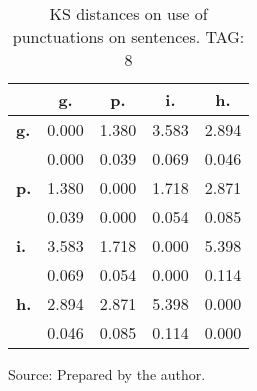 \begin{table}[h!]
\begin{center}
\caption{KS distances on use of punctuations on sentences. TAG: 8}
	\label{tab:kolPct}
\begin{tabular}{| l || c | c | c | c |}\hline
 & {\bf g.} & {\bf p.} & {\bf i.} & {\bf h.} \\\hline\hline
{\bf g.} & 0.000 & 1.380 & 3.583 & 2.894 \\
{\bf } & 0.000 & 0.039 & 0.069 & 0.046 \\\hline
{\bf p.} & 1.380 & 0.000 & 1.718 & 2.871 \\
{\bf } & 0.039 & 0.000 & 0.054 & 0.085 \\\hline
{\bf i.} & 3.583 & 1.718 & 0.000 & 5.398 \\
{\bf } & 0.069 & 0.054 & 0.000 & 0.114 \\\hline
{\bf h.} & 2.894 & 2.871 & 5.398 & 0.000 \\
{\bf } & 0.046 & 0.085 & 0.114 & 0.000 \\\hline
\end{tabular}
\begin{flushleft}
		Source: Prepared by the author.\
\end{flushleft}
\end{center}
\end{table}
